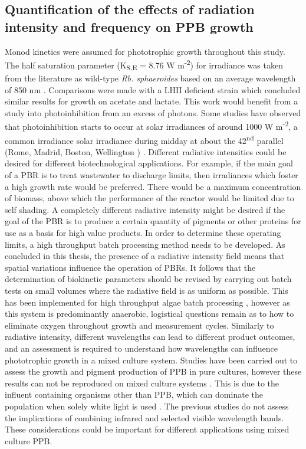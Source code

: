 \subsection{Quantification of the effects of radiation intensity and frequency on PPB growth}
Monod kinetics were assumed for phototrophic growth throughout this study. The half saturation parameter (K\textsubscript{S,E} = 8.76 W m\textsuperscript{-2}) for irradiance was taken from the literature as wild-type \textit{Rb. sphaeroides} based on an average wavelength of 850 nm \cite{eltsova2016}. Comparisons were made with a LHII deficient strain which concluded similar results for growth on acetate and lactate. This work would benefit from a study into photoinhibition from an excess of photons. Some studies have observed that photoinhibition starts to occur at solar irradiances of around 1000 W m\textsuperscript{-2}, a common irradiance solar irradiance during midday at about the 42\textsuperscript{nd} parallel (Rome, Madrid, Boston, Wellington \etc) \cite{adessi2014a,miyake1999}. 
\skippingparagraph
Different radiative intensities could be desired for different biotechnological applications. For example, if the main goal of a PBR is to treat wastewater to discharge limits, then irradiances which foster a high growth rate would be preferred. There would be a maximum concentration of biomass, above which the performance of the reactor would be limited due to self shading. A completely different radiative intensity might be desired if the goal of the PBR is to produce a certain quantity of pigments or other proteins for use as a basis for high value products.
\skippingparagraph
In order to determine these operating limits, a high throughput batch processing method needs to be developed. As concluded in this thesis, the presence of a radiative intensity field means that spatial variations influence the operation of PBRs. It follows that the determination of biokinetic parameters should be revised by carrying out batch tests on small volumes where the radiative field is as uniform as possible. This has been implemented for high throughput algae batch processing \cite{vanwagenen2014}, however as this system is predominantly anaerobic, logistical questions remain as to how to eliminate oxygen throughout growth and measurement cycles.
\skippingparagraph
Similarly to radiative intensity, different wavelengths can lead to different product outcomes, and an assessment is required to understand how wavelengths can influence phototrophic growth in a mixed culture system. Studies have been carried out to assess the growth and pigment production of PPB in pure cultures, however these results can not be reproduced on mixed culture systems \cite{kuo2012}. This is due to the influent containing organisms other than PPB, which can dominate the population when solely white light is used \cite{hulsen2015}. The previous studies do not assess the implications of combining infrared and selected visible wavelength bands. These considerations could be important for different applications using mixed culture PPB. 
